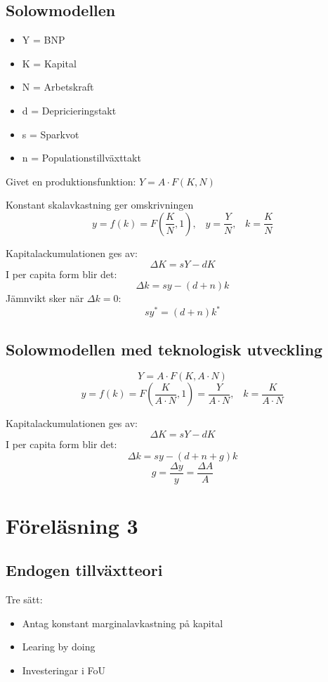 \documentclass[12pt,a4paper]{article}
\begin{document}
\subsection*{Solowmodellen}
\begin{itemize}
    \item Y = BNP
    \item K = Kapital
    \item N = Arbetskraft
    \item d = Depricieringstakt
    \item s = Sparkvot
    \item n = Populationstillväxttakt
\end{itemize}
Givet en produktionsfunktion: $Y = A \cdot F(K, N)$
\vspace{10pt}

\noindent Konstant skalavkastning ger omskrivningen 
$$y = f(k) = F(\frac{K}{N}, 1), \hspace{10pt} y = \frac{Y}{N}, \hspace{10pt}k = \frac{K}{N}$$

\noindent Kapitalackumulationen ges av:
$$\Delta K = sY - dK$$
\vspace{10pt}
\noindent I per capita form blir det:
$$\Delta k = sy - (d + n)k$$
\vspace{10pt}
\noindent Jämnvikt sker när $\Delta k = 0$:
$$sy^* = (d + n)k^*$$

\subsection*{Solowmodellen med teknologisk utveckling}
$$Y = A \cdot F(K, A \cdot N)$$
$$y = f(k) = F(\frac{K}{A \cdot N}, 1) = \frac{Y}{A \cdot N}, \hspace{10pt}k = \frac{K}{A \cdot N}$$

\noindent Kapitalackumulationen ges av:
$$\Delta K = sY - dK$$
\vspace{10pt}
\noindent I per capita form blir det:
$$\Delta k = sy - (d + n + g)k$$
\vspace{10pt}
$$g = \frac{\Delta y}{y} = \frac{\Delta A}{A}$$

\section*{Föreläsning 3}
\subsection*{Endogen tillväxtteori}
Tre sätt:
\begin{itemize}
    \item Antag konstant marginalavkastning på kapital
    \item Learing by doing
    \item Investeringar i FoU
\end{itemize}
\end{document}
